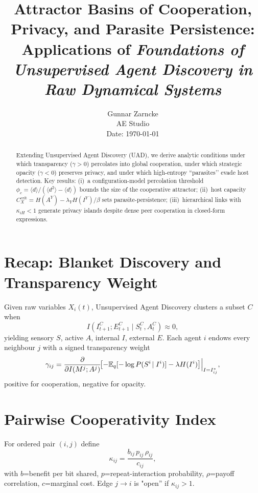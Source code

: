 \documentclass[10pt,conference]{IEEEtran}
\title{Attractor Basins of Cooperation, Privacy, and Parasite Persistence:\\
Applications of \emph{Foundations of Unsupervised Agent Discovery in Raw Dynamical Systems}\footnotemark}
\author{Gunnar Zarncke\\
AE Studio\\
\small{Date: \today}}
\newcommand{\precision}{\gamma}        %
\begin{document}
\maketitle
{}

\begin{abstract}
Extending Unsupervised Agent Discovery (UAD), we derive analytic conditions under which transparency (\(\gamma>0\)) percolates into global cooperation, under which strategic opacity (\(\gamma<0\)) preserves privacy, and under which high-entropy “parasites’’ evade host detection.  Key results: (i)~a configuration-model percolation threshold
\(\phi_c=\langle d\rangle/(\langle d^2\rangle-\langle d\rangle)\) bounds the size of the cooperative attractor; (ii)~host capacity \(C_X^{\mathrm{crit}}=H(A^Y)-\lambda_YH(I^Y)/\beta\) sets parasite-persistence; (iii)~hierarchical links with \(\kappa_{iH}<1\) generate privacy islands despite dense peer cooperation in closed-form expressions. 
\end{abstract}

\section{Recap: Blanket Discovery and Transparency Weight}

Given raw variables \(X_i(t)\), Unsupervised Agent Discovery  clusters a subset \(C\) when
\[
I(I^C_{t+1};E^C_{t+1}\mid S^C_t,A^C_t)\approx0,
\]
yielding sensory \(S\), active \(A\), internal \(I\), external \(E\).  
Each agent \(i\) endows every neighbour \(j\) with a signed transparency weight
\[
\precision_{ij}
=\Bigl.\frac{\partial}{\partial I(M^j;A^j)}
\!\bigl[-\mathbb E_q[-\log P(S^i\!\mid I^i)]-\lambda H(I^i)\bigr]\Bigr|_{I=I^*_{ij}},
\]
positive for cooperation, negative for opacity.

\section{Pairwise Cooperativity Index}

For ordered pair \((i,j)\) define
\[
\kappa_{ij}=\frac{b_{ij}\,p_{ij}\,\rho_{ij}}{c_{ij}},
\]
with \(b\)=benefit per bit shared, \(p\)=repeat-interaction probability, \(\rho\)=payoff correlation, \(c\)=marginal cost.  
Edge \(j\!\to\! i\) is "open'' if \(\kappa_{ij}>1\).  
\end{document}
